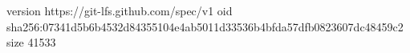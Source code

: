 version https://git-lfs.github.com/spec/v1
oid sha256:07341d5b6b4532d84355104e4ab5011d33536b4bfda57dfb0823607dc48459c2
size 41533
